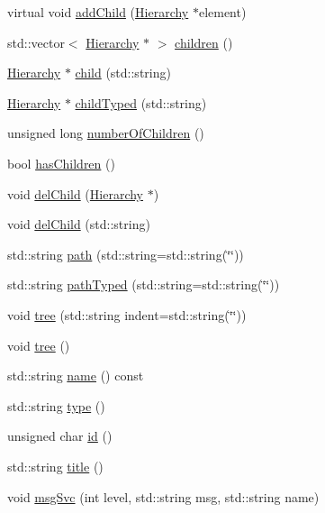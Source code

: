 \begin{DoxyCompactItemize}
\item 
virtual void \hyperlink{classHierarchy_ad677774ff38fcb257c04a3a10d471fac}{addChild} (\hyperlink{classHierarchy}{Hierarchy} $\ast$element)
\item 
std::vector$<$ \hyperlink{classHierarchy}{Hierarchy} $\ast$ $>$ \hyperlink{classHierarchy_aa9a76f69e98e052ee1a6e32cea006288}{children} ()
\item 
\hyperlink{classHierarchy}{Hierarchy} $\ast$ \hyperlink{classHierarchy_a1e207f973c694b538bf90107b4868817}{child} (std::string)
\item 
\hyperlink{classHierarchy}{Hierarchy} $\ast$ \hyperlink{classHierarchy_a0c15a5276a3b80b4354d6bd8a01e0708}{childTyped} (std::string)
\item 
unsigned long \hyperlink{classHierarchy_ab16e84de65fd84e14001a6cf941c8be4}{numberOfChildren} ()
\item 
bool \hyperlink{classHierarchy_a255174fe4d316d2a3f430dcb9dab29f1}{hasChildren} ()
\item 
void \hyperlink{classHierarchy_a2b2b359fac003233f65786a616766bde}{delChild} (\hyperlink{classHierarchy}{Hierarchy} $\ast$)
\item 
void \hyperlink{classHierarchy_a1928ac7615fe0b5e55cd707f70dc6781}{delChild} (std::string)
\item 
std::string \hyperlink{classHierarchy_aa7990fa7caf132d83e361ce033c6c65a}{path} (std::string=std::string(\char`\"{}\char`\"{}))
\item 
std::string \hyperlink{classHierarchy_a1efd56cd164d328d2002e53a10a19b8c}{pathTyped} (std::string=std::string(\char`\"{}\char`\"{}))
\item 
void \hyperlink{classHierarchy_a76e914b9a677a22a82deb74d892bf261}{tree} (std::string indent=std::string(\char`\"{}\char`\"{}))
\item 
void \hyperlink{classHierarchy_a594c294c5f60c230e106d522ed008212}{tree} ()
\item 
std::string \hyperlink{classObject_a975e888d50bfcbffda2c86368332a5cd}{name} () const 
\item 
std::string \hyperlink{classObject_a84f99f70f144a83e1582d1d0f84e4e62}{type} ()
\item 
unsigned char \hyperlink{classObject_af99145335cc61ff6e2798ea17db009d2}{id} ()
\item 
std::string \hyperlink{classObject_a73a0f1a41828fdd8303dd662446fb6c3}{title} ()
\item 
void \hyperlink{classObject_a3f9d5537ebce0c0f2bf6ae4d92426f3c}{msgSvc} (int level, std::string msg, std::string name)

\end{DoxyCompactItemize}
